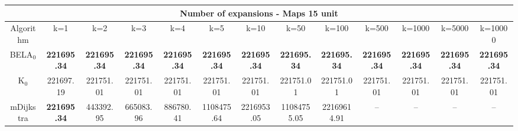 \begin{tabular}{c|cccccccccccc}\toprule
\multicolumn{13}{c}{Number of expansions - Maps 15 unit}\\ \midrule
Algorithm & k=1 & k=2 & k=3 & k=4 & k=5 & k=10 & k=50 & k=100 & k=500 & k=1000 & k=5000 & k=10000 \\ \midrule
BELA$_0$ & \textbf{221695.34} & \textbf{221695.34} & \textbf{221695.34} & \textbf{221695.34} & \textbf{221695.34} & \textbf{221695.34} & \textbf{221695.34} & \textbf{221695.34} & \textbf{221695.34} & \textbf{221695.34} & \textbf{221695.34} & \textbf{221695.34} \\
K$_0$ & 221697.19 & 221751.01 & 221751.01 & 221751.01 & 221751.01 & 221751.01 & 221751.01 & 221751.01 & 221751.01 & 221751.01 & 221751.01 & 221751.01 \\
mDijkstra & \textbf{221695.34} & 443392.95 & 665083.96 & 886780.41 & 1108475.64 & 2216953.05 & 11084755.05 & 22169614.91 & -- & -- & -- & -- \\ \bottomrule 
\end{tabular}
